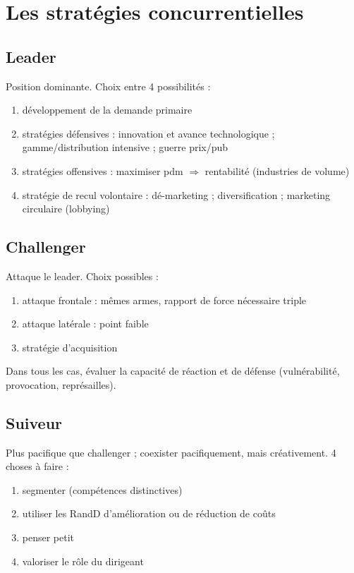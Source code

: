		
	\section{Les stratégies concurrentielles}
		
		\subsection{Leader}
		
		Position dominante. Choix entre 4 possibilités :
		
		\begin{enumerate}
			\item développement de la demande primaire
			\item stratégies défensives : innovation et avance technologique ; gamme/distribution intensive ; guerre prix/pub
			\item stratégies offensives : maximiser pdm $\Rightarrow$ rentabilité (industries de volume)
			\item stratégie de recul volontaire : dé-marketing ; diversification ; marketing circulaire (lobbying)
		\end{enumerate}
		
		\subsection{Challenger}
		
		Attaque le leader. Choix possibles :
		
		\begin{enumerate}
			\item attaque frontale : mêmes armes, rapport de force nécessaire triple
			\item attaque latérale : point faible
			\item stratégie d'acquisition
		\end{enumerate}
		
		Dans tous les cas, évaluer la capacité de réaction et de défense (vulnérabilité, provocation, représailles).
		
		\subsection{Suiveur}
		
		Plus pacifique que challenger ; coexister pacifiquement, mais créativement. 4 choses à faire :
		
		\begin{enumerate}
			\item segmenter (compétences distinctives)
			\item utiliser les RandD d'amélioration ou de réduction de coûts
			\item penser petit
			\item valoriser le rôle du dirigeant
		\end{enumerate}
		
